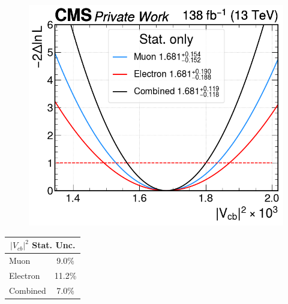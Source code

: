\begin{minipage}{\linewidth}
    \begin{minipage}{0.74\linewidth}
        \begin{figure}[H]
        \centering
        \includegraphics[width=\linewidth]{fig//chap09-sigback/stat_like.png}
        
        
        \end{figure}
    \end{minipage}
    \hfill
    \begin{minipage}{0.25\linewidth}
        
        \begin{table}[H]
            \centering
            \begin{tabular}{l|c}
                \toprule
                \multicolumn{2}{c}{\textbf{$|V_{cb}|^2$ Stat. Unc.}} \\
                \midrule
                 Muon & 9.0\% \\
                 Electron & 11.2\% \\
                 Combined & 7.0\% \\
                 \bottomrule
            \end{tabular}
            \label{tab:my_label}
        \end{table}
    \end{minipage}
    
    \label{fig:stat_fit}
\end{minipage}


